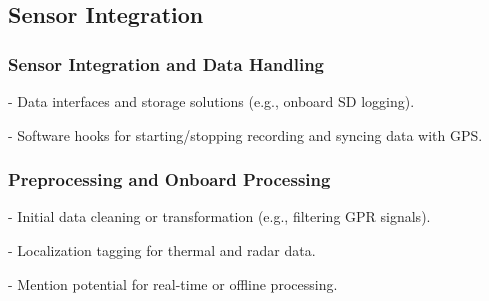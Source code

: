\subsection{Sensor Integration}

\subsubsection{Sensor Integration and Data Handling}
- Data interfaces and storage solutions (e.g., onboard SD logging).

- Software hooks for starting/stopping recording and syncing data with GPS.

\subsubsection{Preprocessing and Onboard Processing}
- Initial data cleaning or transformation (e.g., filtering GPR signals).

- Localization tagging for thermal and radar data.

- Mention potential for real-time or offline processing.
